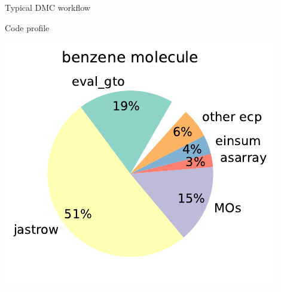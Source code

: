 \begin{frame}{Typical DMC workflow}
\begin{minipage}{\textwidth}
  \begin{center}
  
  \end{center}
\end{minipage}
\end{frame}




\begin{frame}{Code profile}
\begin{minipage}{.45\textwidth}
\includegraphics[height=.45\textheight]{figures/profile_benzene.pdf}


\end{minipage}
\end{frame}
